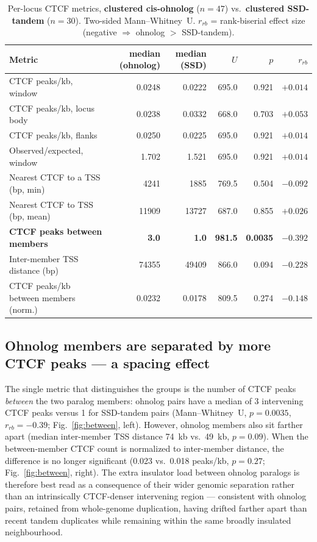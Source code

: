 \documentclass[11pt]{article}
\newcommand{\ohno}{\textcolor{ohno}{\textbf{clustered cis-ohnolog}}}
\newcommand{\ssd}{\textcolor{ssd}{\textbf{clustered SSD-tandem}}}
\begin{document}
\begin{table}[H]
\centering
\small
\caption{Per-locus CTCF metrics, \ohno{} ($n=47$) vs.\ \ssd{} ($n=30$).
Two-sided Mann--Whitney~U. $r_{rb}$ = rank-biserial effect size
(negative $\Rightarrow$ ohnolog $>$ SSD-tandem).}
\label{tab:mwu}
\begin{tabular}{lrrrrr}
\toprule
Metric & median (ohnolog) & median (SSD) & $U$ & $p$ & $r_{rb}$ \\
\midrule
CTCF peaks/kb, window        & 0.0248 & 0.0222 & 695.0 & 0.921 & $+0.014$ \\
CTCF peaks/kb, locus body    & 0.0238 & 0.0332 & 668.0 & 0.703 & $+0.053$ \\
CTCF peaks/kb, flanks        & 0.0250 & 0.0225 & 695.0 & 0.921 & $+0.014$ \\
Observed/expected, window    & 1.702  & 1.521  & 695.0 & 0.921 & $+0.014$ \\
Nearest CTCF to a TSS (bp, min)  & 4241 & 1885 & 769.5 & 0.504 & $-0.092$ \\
Nearest CTCF to TSS (bp, mean)   & 11909 & 13727 & 687.0 & 0.855 & $+0.026$ \\
\textbf{CTCF peaks between members} & \textbf{3.0} & \textbf{1.0} & \textbf{981.5} & \textbf{0.0035} & $\mathbf{-0.392}$ \\
Inter-member TSS distance (bp)   & 74355 & 49409 & 866.0 & 0.094 & $-0.228$ \\
CTCF peaks/kb between members (norm.) & 0.0232 & 0.0178 & 809.5 & 0.274 & $-0.148$ \\
\bottomrule
\end{tabular}
\end{table}

\subsection*{Ohnolog members are separated by more CTCF peaks --- a spacing effect}
The single metric that distinguishes the groups is the number of CTCF peaks \emph{between}
the two paralog members: ohnolog pairs have a median of 3 intervening CTCF peaks versus 1 for
SSD-tandem pairs (Mann--Whitney~U, $p=0.0035$, $r_{rb}=-0.39$; Fig.~\ref{fig:between}, left).
However, ohnolog members also sit farther apart (median inter-member TSS distance 74~kb vs.\
49~kb, $p=0.09$). When the between-member CTCF count is normalized to inter-member distance,
the difference is no longer significant (0.023 vs.\ 0.018 peaks/kb, $p=0.27$;
Fig.~\ref{fig:between}, right). The extra insulator load between ohnolog paralogs is
therefore best read as a consequence of their wider genomic separation rather than an
intrinsically CTCF-denser intervening region --- consistent with ohnolog pairs, retained from
whole-genome duplication, having drifted farther apart than recent tandem duplicates while
remaining within the same broadly insulated neighbourhood.
\end{document}

